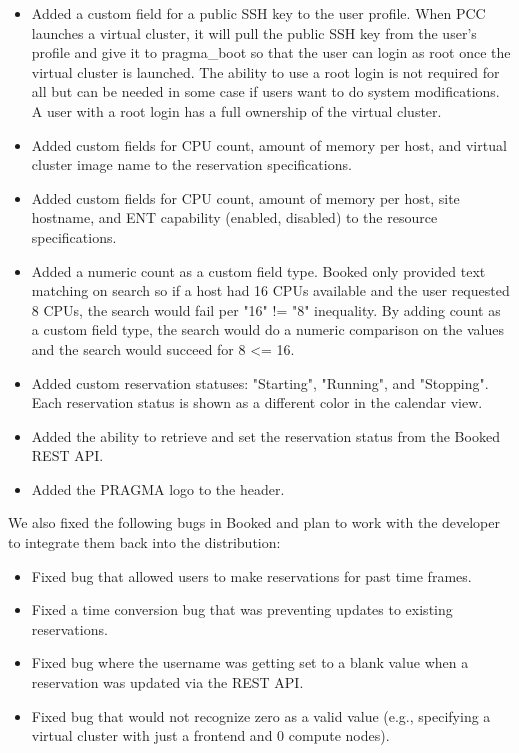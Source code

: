 \documentclass{acm_proc_article-sp}
\begin{document}
\begin{itemize}
\item Added a custom field for a public SSH key  to the user profile.  When PCC launches a virtual cluster, it will pull the public SSH key from the user's  profile and give it to pragma\_boot so that the user can login as root once the virtual cluster is launched.   The ability to use a root login is not required for all but can be needed in some case if users want to do system modifications. A user with a root login has a full ownership of the virtual cluster. 
\item Added custom fields for CPU count, amount of memory per host, and virtual cluster image name to the reservation specifications.
\item Added custom fields for CPU count, amount of memory per host, site hostname, and ENT capability (enabled, disabled) to the resource specifications.
\item Added a numeric count as a custom field type.  Booked only provided text matching on search so if a host had 16 CPUs available and the user requested 8 CPUs, the search would fail per "16" != "8" inequality.  By adding count as a custom field type, the search would do a numeric comparison on the values and the search would succeed for 8 <= 16.
\item Added custom reservation statuses: "Starting", "Running", and "Stopping".  Each reservation status is shown as a different color in  the calendar view.
\item Added the ability to retrieve and set the reservation status from the Booked REST API.  	
\item Added the PRAGMA logo to the header.
\end{itemize}

We also fixed the following bugs in Booked and plan to work with the developer to integrate them back into the distribution:

\begin{itemize}
\item Fixed bug that allowed users to make reservations for past time frames.
\item Fixed a time conversion bug that was preventing updates to existing reservations.
\item Fixed bug where the username was getting set to a blank value when a reservation was updated via the REST API. 
\item Fixed bug that would not recognize zero as a valid value (e.g., specifying a virtual cluster with just a frontend and 0 compute nodes).  
\end{itemize}
\end{document}
